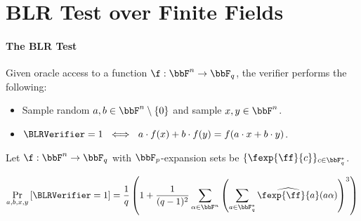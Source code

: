 \section{BLR Test over Finite Fields}
\label{sec:blr over finite fields}

\paragraph{The BLR Test}Given oracle access to a function $\f:\bbF^n\rightarrow\bbF_q$, the verifier performs the following:
\begin{itemize}
    \item Sample random $a,b\in\bbF^n\setminus\{0\}$ and sample $x,y\in\bbF^n$. 
    \item $\BLRVerifier=1 \ \iff \ a\cdot f(x)+b\cdot f(y) = f(a\cdot x+b\cdot y)$. 
\end{itemize}

\begin{theorem}\label{FieldBLR}
Let $\f:\bbF^n\rightarrow\bbF_q$ with $\bbF_p$-expansion sets be $\{\fexp{\ff}{c}\}_{c\in\bbF_q^{*}}$. 

\[
\Pr_{a,b,x,y}\left[\BLRVerifier=1 \right] = \frac{1}{q}\left(1+\frac{1}{(q-1)^2}\sum_{\alpha\in\bbF^n}\left(\sum_{a\in\bbF_q^{*}}\widehat{\fexp{\ff}{a}}(a\alpha)\right)^3\right)
\]
\end{theorem}


